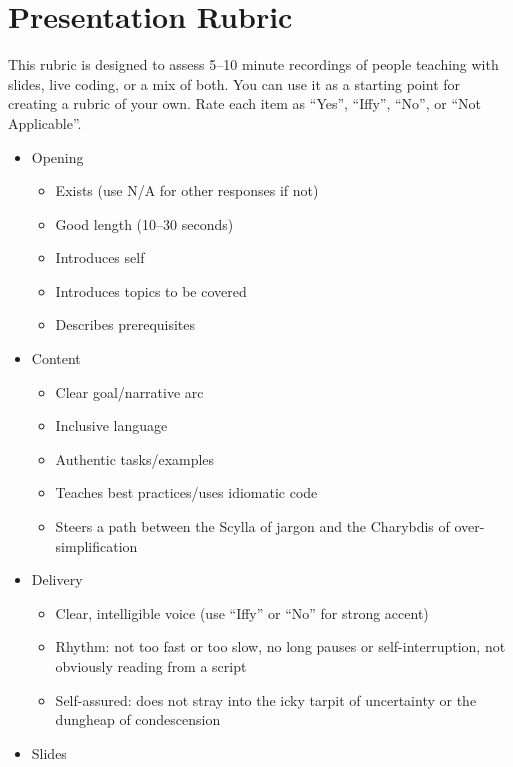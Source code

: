 \chapter{Presentation Rubric}\label{s:teacheval}

This rubric is designed to assess 5--10 minute recordings of people
teaching with slides, live coding, or a mix of both. You can use it as
a starting point for creating a rubric of your own. Rate each item as
``Yes'', ``Iffy'', ``No'', or ``Not Applicable''.

\begin{itemize}
\tightlist
\item
  Opening

  \begin{itemize}
  \tightlist
  \item
    Exists (use N/A for other responses if not)
  \item
    Good length (10--30 seconds)
  \item
    Introduces self
  \item
    Introduces topics to be covered
  \item
    Describes prerequisites
  \end{itemize}
\item
  Content

  \begin{itemize}
  \tightlist
  \item
    Clear goal/narrative arc
  \item
    Inclusive language
  \item
    Authentic tasks/examples
  \item
    Teaches best practices/uses idiomatic code
  \item
    Steers a path between the Scylla of jargon and the Charybdis of over-simplification
  \end{itemize}
\item
  Delivery

  \begin{itemize}
  \tightlist
  \item
    Clear, intelligible voice (use ``Iffy'' or ``No'' for strong accent)
  \item
    Rhythm: not too fast or too slow, no long pauses or self-interruption, not obviously reading from a script
  \item
    Self-assured: does not stray into the icky tarpit of uncertainty or the dungheap of condescension
  \end{itemize}
\item
  Slides


\end{itemize}
